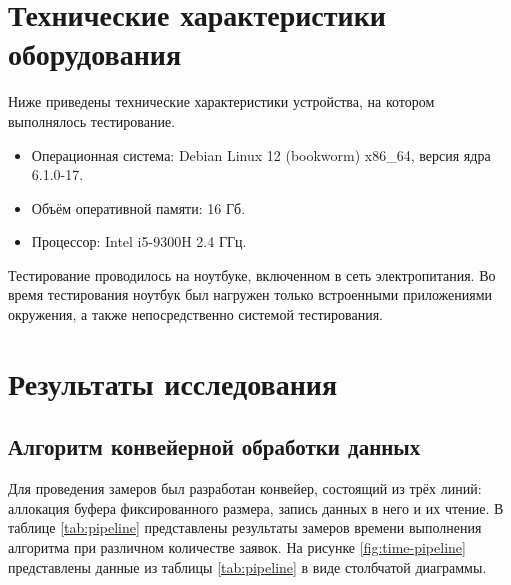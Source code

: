\section*{Технические характеристики оборудования}

Ниже приведены технические характеристики устройства, на котором выполнялось тестирование.

\begin{itemize}[label*=---]
	\item Операционная система: Debian Linux 12 (bookworm) x86\_64, версия ядра 6.1.0-17.
	\item Объём оперативной памяти: 16 Гб.
	\item Процессор: Intel i5-9300H 2.4 ГГц.
\end{itemize}

Тестирование проводилось на ноутбуке, включенном в сеть электропитания. Во время тестирования ноутбук был нагружен только встроенными приложениями окружения, а также непосредственно системой тестирования.



\section*{Результаты исследования}

\subsection*{Алгоритм конвейерной обработки данных}

Для проведения замеров был разработан конвейер, состоящий из трёх линий: аллокация буфера фиксированного размера, запись данных в него и их чтение. В таблице \ref{tab:pipeline} представлены результаты замеров времени выполнения алгоритма при различном количестве заявок. На рисунке \ref{fig:time-pipeline} представлены данные из таблицы \ref{tab:pipeline} в виде столбчатой диаграммы.

